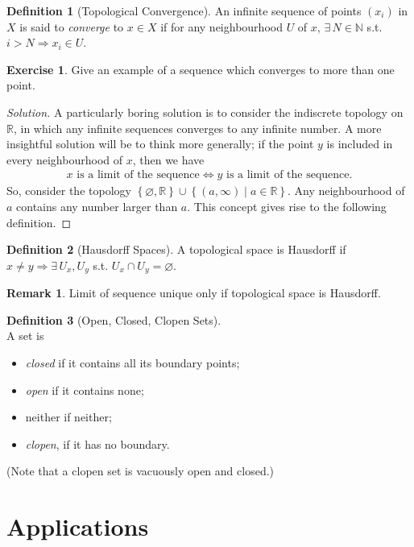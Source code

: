 \documentclass{article}
\theoremstyle{definition}
\newtheorem{defn}{Definition}[subsubsection]
\newtheorem{rmk}{Remark}[subsubsection]
\newtheorem{exercise}{Exercise}[subsubsection]
\newenvironment{soln}
  {\begin{proof}[Solution]\vspace{-5pt}\setlength{\parskip}{0pt}} %
  {\end{proof}\vspace{-5pt}} %
\begin{document}
\begin{defn}[Topological Convergence]
	An infinite sequence of points $(x_i)$ in $X$ is said to \emph{converge} to $x\in X$ if for any neighbourhood $U$ of $x$, $\exists\,N\in \mathbb{N}$ s.t. $i>N\Rightarrow x_i\in U$.
\end{defn}
\begin{exercise}
	Give an example of a sequence which converges to more than one point.
\end{exercise}
\begin{soln}
	A particularly boring solution is to consider the indiscrete topology on $\mathbb{R}$, in which any infinite sequences converges to any infinite number. A more insightful solution will be to think more generally; if the point $y$ is included in every neighbourhood of $x$, then we have
	\begin{align*}
		x\text{ is a limit of the sequence}\iff y\text{ is a limit of the sequence}.
	\end{align*}
	So, consider the topology $\left\{\varnothing,\mathbb{R}\right\}\cup\left\{(a,\infty)\mid a\in \mathbb{R}\right\}$. Any neighbourhood of $a$ contains any number larger than $a$. This concept gives rise to the following definition.
\end{soln}
\begin{defn}[Hausdorff Spaces]
	A topological space is Hausdorff if $x\not=y\Rightarrow\exists\,U_x,U_y$ s.t. $U_x\cap U_y=\varnothing$.
\end{defn}
\begin{rmk}
	Limit of sequence unique only if topological space is Hausdorff.
\end{rmk}
\begin{defn}[Open, Closed, Clopen Sets]
	$ $\\A set is
	\begin{itemize}
		\item \emph{closed} if it contains all its boundary points;
		\item \emph{open} if it contains none;
		\item neither if neither;
		\item \emph{clopen}, if it has no boundary.
	\end{itemize}
	(Note that a clopen set is vacuously open and closed.)
\end{defn}



\newpage
\section{Applications}
\end{document}
